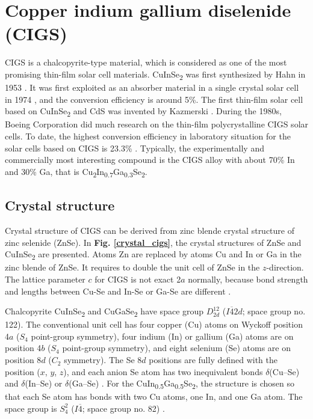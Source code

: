 \documentclass[a4paper, 12pt, titlepage,oneside,drop]{kthesis}
\begin{document}
\section{Copper indium gallium diselenide (CIGS)}
CIGS is a chalcopyrite-type material, which is considered as one of the most promising thin-film solar cell materials. 
CuInSe\textsubscript{2} was first synthesized by Hahn in 1953 \cite{ZAAC}. It was first exploited as an absorber material in a single crystal solar cell in 1974 \cite{CuInSe21974}, and the conversion efficiency is around 
5\%. The first thin-film solar cell based on CuInSe\textsubscript{2} and CdS was invented by Kazmerski \cite{kazmerski1976thin}. During the 1980s, Boeing Corporation did much research on the thin-film polycrystalline CIGS solar cells. 
To date, the highest conversion efficiency in laboratory situation for the solar cells based on CIGS is 23.3\% \cite{ward2014cu}. Typically, the experimentally and commercially most interesting compound is the CIGS alloy with about 70\% In and
30\% Ga, that is Cu\textsubscript{2}In\textsubscript{0.7}Ga\textsubscript{0.3}Se\textsubscript{2}.


\subsection{Crystal structure}
Crystal structure of CIGS can be derived from zinc blende crystal structure of zinc selenide (ZnSe). In \textbf{Fig. \ref{crystal_cigs}}, the crystal structures of ZnSe and CuInSe\textsubscript{2} are presented. 
Atoms Zn are replaced by atoms Cu and In or Ga in the zinc blende of ZnSe. It requires to double the unit cell of ZnSe in the $z$-direction. The lattice parameter $c$ for CIGS is not exact 2$a$ normally, because bond 
strength and lengths between Cu-Se and In-Se or Ga-Se are different \cite{chen2009crystal}.

Chalcopyrite CuInSe\textsubscript{2} and CuGaSe\textsubscript{2} have space group $D_{2d}^{12}$ ($I\overline{4}2d$; space group no. 122).
The conventional unit cell has four copper (Cu) atoms on Wyckoff position 4$a$ ($S_4$ point-group symmetry), four indium (In) or gallium (Ga) atoms are on position 4$b$ ($S_4$ point-group symmetry),
and eight selenium (Se) atoms are on position 8$d$ ($C_2$ symmetry). 
The Se 8$d$ positions are fully defined with the position ($x$, $y$, $z$), and each anion Se atom has two inequivalent bonds $\delta$(Cu–Se) and $\delta$(In–Se) or $\delta$(Ga–Se) \cite{parlak2006ab, hones2008polarization,persson2008anisotropic}. 
For the CuIn\textsubscript{0.5}Ga\textsubscript{0.5}Se\textsubscript{2}, the structure is chosen so that each Se atom has bonds with two Cu atoms, one In, and one Ga atom. The space group is $S_{4}^{2}$ ($I\overline{4}$; space 
group no. 82) \cite{li2011electronic}.
\end{document}

